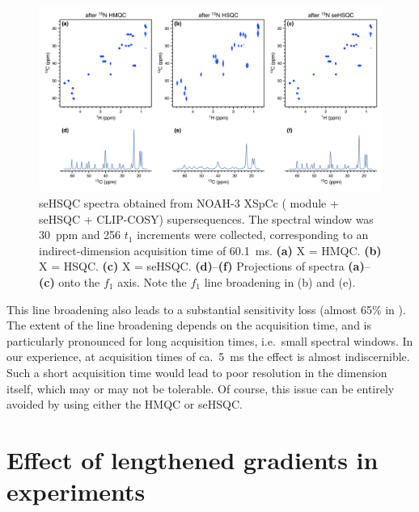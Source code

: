 \begin{figure}
    \centering
    \includegraphics[width=\textwidth]{./figures/n15_linebroadening.png}
    \caption{
        \carbon{} seHSQC spectra obtained from NOAH-3 XSpCc (\nitrogen{} module + \carbon{} seHSQC + CLIP-COSY) supersequences.
        The \nitrogen{} spectral window was \SI{30}{ppm} and 256 $t_1$ increments were collected, corresponding to an indirect-dimension \nitrogen{} acquisition time of \SI{60.1}{\ms}.
        \textbf{(a)} X = HMQC.
        \textbf{(b)} X = HSQC.
        \textbf{(c)} X = seHSQC.
        \textbf{(d)}--\textbf{(f)} Projections of spectra \textbf{(a)}--\textbf{(c)} onto the $f_1$ axis.
        Note the $f_1$ line broadening in (b) and (e).
        \grami{}
    }
    \label{fig:n15_linebroadening}
\end{figure}

This line broadening also leads to a substantial sensitivity loss (almost 65\% in ).
The extent of the line broadening depends on the acquisition time, and is particularly pronounced for long acquisition times, i.e.\ small \nitrogen{} spectral windows.
In our experience, at \nitrogen{} acquisition times of ca.\ \SI{5}{\ms} the effect is almost indiscernible.
Such a short acquisition time would lead to poor resolution in the \nitrogen{} dimension itself, which may or may not be tolerable.
Of course, this issue can be entirely avoided by using either the HMQC or seHSQC.

\section{Effect of lengthened gradients in \texorpdfstring{\nitrogen{}}{15N} experiments}

